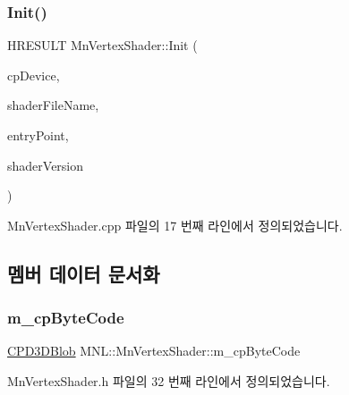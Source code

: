 \subsubsection{\texorpdfstring{Init()}{Init()}}
{\footnotesize\ttfamily H\+R\+E\+S\+U\+LT Mn\+Vertex\+Shader\+::\+Init (\begin{DoxyParamCaption}\item[{\hyperlink{namespace_m_n_l_a1eec210db8f309a4a9ac0d9658784c31}{C\+P\+D3\+D\+Device}}]{cp\+Device,  }\item[{std\+::wstring}]{shader\+File\+Name,  }\item[{std\+::string}]{entry\+Point,  }\item[{std\+::string}]{shader\+Version }\end{DoxyParamCaption})}



Mn\+Vertex\+Shader.\+cpp 파일의 17 번째 라인에서 정의되었습니다.



\subsection{멤버 데이터 문서화}
\mbox{\label{class_m_n_l_1_1_mn_vertex_shader_acac8cfa86f343e2d2c016c967414af3b}} 
\subsubsection{\texorpdfstring{m\+\_\+cp\+Byte\+Code}{m\_cpByteCode}}
{\footnotesize\ttfamily \hyperlink{namespace_m_n_l_a3716e3bee60c31fe1b7b5dd5a82db59a}{C\+P\+D3\+D\+Blob} M\+N\+L\+::\+Mn\+Vertex\+Shader\+::m\+\_\+cp\+Byte\+Code\hspace{0.3cm}{\ttfamily [private]}}



Mn\+Vertex\+Shader.\+h 파일의 32 번째 라인에서 정의되었습니다.

\mbox{\label{class_m_n_l_1_1_mn_vertex_shader_a8033aa677c077c1a84cfaa1120a630dc}} 
